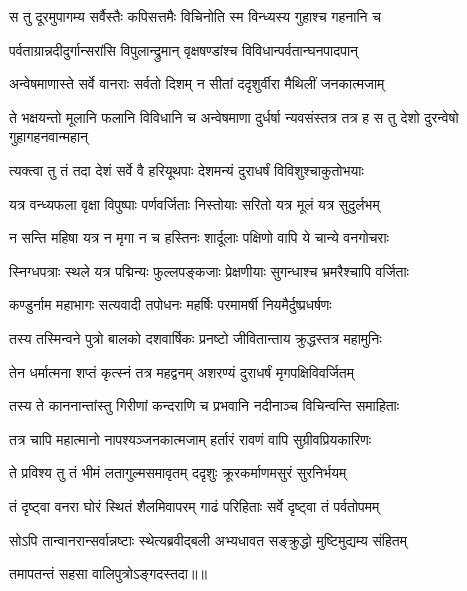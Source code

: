\twolineshloka
{स तु दूरमुपागम्य सर्वैस्तैः कपिसत्तमैः}
{विचिनोति स्म विन्ध्यस्य गुहाश्च गहनानि च} %

\twolineshloka
{पर्वताग्रान्नदीदुर्गान्सरांसि विपुलान्द्रुमान्}
{वृक्षषण्डांश्च विविधान्पर्वतान्घनपादपान्} %

\twolineshloka
{अन्वेषमाणास्ते सर्वे वानराः सर्वतो दिशम्}
{न सीतां ददृशुर्वीरा मैथिलीं जनकात्मजाम्} %

\threelineshloka
{ते भक्षयन्तो मूलानि फलानि विविधानि च}
{अन्वेषमाणा दुर्धर्षा न्यवसंस्तत्र तत्र ह}
{स तु देशो दुरन्वेषो गुहागहनवान्महान्} %

\twolineshloka
{त्यक्त्वा तु तं तदा देशं सर्वे वै हरियूथपाः}
{देशमन्यं दुराधर्षं विविशुश्चाकुतोभयाः} %

\twolineshloka
{यत्र वन्ध्यफला वृक्षा विपुष्पाः पर्णवर्जिताः}
{निस्तोयाः सरितो यत्र मूलं यत्र सुदुर्लभम्} %

\twolineshloka
{न सन्ति महिषा यत्र न मृगा न च हस्तिनः}
{शार्दूलाः पक्षिणो वापि ये चान्ये वनगोचराः} %

\twolineshloka
{स्निग्धपत्राः स्थले यत्र पद्मिन्यः फुल्लपङ्कजाः}
{प्रेक्षणीयाः सुगन्धाश्च भ्रमरैश्चापि वर्जिताः} %

\twolineshloka
{कण्डुर्नाम महाभागः सत्यवादी तपोधनः}
{महर्षिः परमामर्षी नियमैर्दुष्प्रधर्षणः} %

\twolineshloka
{तस्य तस्मिन्वने पुत्रो बालको दशवार्षिकः}
{प्रनष्टो जीवितान्ताय क्रुद्धस्तत्र महामुनिः} %

\twolineshloka
{तेन धर्मात्मना शप्तं कृत्स्नं तत्र महद्वनम्}
{अशरण्यं दुराधर्षं मृगपक्षिविवर्जितम्} %

\twolineshloka
{तस्य ते काननान्तांस्तु गिरीणां कन्दराणि च}
{प्रभवानि नदीनाञ्च विचिन्वन्ति समाहिताः} %

\twolineshloka
{तत्र चापि महात्मानो नापश्यञ्जनकात्मजाम्}
{हर्तारं रावणं वापि सुग्रीवप्रियकारिणः} %

\twolineshloka
{ते प्रविश्य तु तं भीमं लतागुल्मसमावृतम्}
{ददृशुः क्रूरकर्माणमसुरं सुरनिर्भयम्} %

\twolineshloka
{तं दृष्ट्वा वनरा घोरं स्थितं शैलमिवापरम्}
{गाढं परिहिताः सर्वे दृष्ट्वा तं पर्वतोपमम्} %

\twolineshloka
{सोऽपि तान्वानरान्सर्वान्नष्टाः स्थेत्यब्रवीद्बली}
{अभ्यधावत सङ्क्रुद्धो मुष्टिमुद्यम्य संहितम्} %

{तमापतन्तं सहसा वालिपुत्रोऽङ्गदस्तदा॥॥} %

